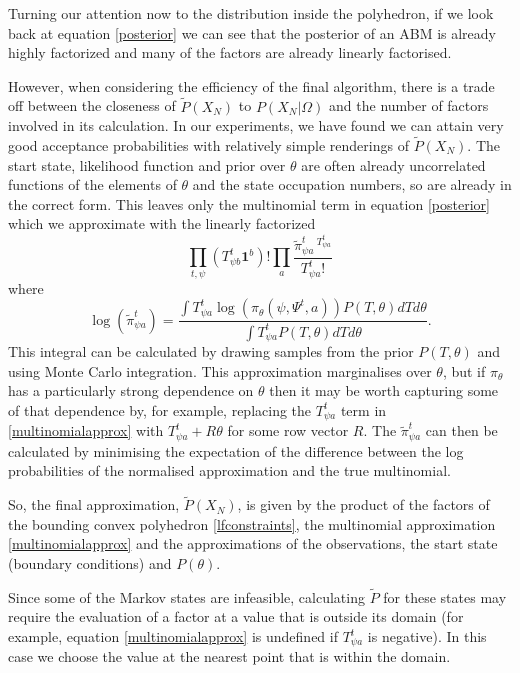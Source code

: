 \documentclass{article}
\begin{document}
Turning our attention now to the distribution inside the polyhedron, if we look back at equation \eqref{posterior} we can see that the posterior of an ABM is already highly factorized and many of the factors are already linearly factorised.

However, when considering the efficiency of the final algorithm, there is a trade off between the closeness of $\tilde{P}(X_N)$ to $P(X_N|\Omega)$ and the number of factors involved in its calculation. In our experiments, we have found we can attain very good acceptance probabilities with relatively simple renderings of $\tilde{P}(X_N)$. The start state, likelihood function and prior over $\theta$ are often already uncorrelated functions of the elements of $\theta$ and the state occupation numbers, so are already in the correct form. This leaves only the multinomial term in equation \eqref{posterior} which we approximate with the linearly factorized
\begin{equation}
\prod_{t, \psi}\left(T^t_{\psi b}\mathbf{1}^b\right)! \prod_a \frac{\tilde{\pi}^t_{\psi a}\,^{T^t_{\psi a}}}{T^t_{\psi a}!}
\label{multinomialapprox}
\end{equation}
where
\[
\log(\tilde{\pi}^t_{\psi a}) = \frac{\int T^t_{\psi a}\log\left(\pi_\theta(\psi, \Psi^t, a)\right)P(T,\theta) dT d\theta}{\int T^t_{\psi a}P(T,\theta) dT d\theta}.
\]
This integral can be calculated by drawing samples from the prior $P(T,\theta)$ and using Monte Carlo integration. This approximation marginalises over $\theta$, but if $\pi_\theta$ has a particularly strong dependence on $\theta$ then it may be worth capturing some of that dependence by, for example, replacing the $T^t_{\psi a}$ term in \eqref{multinomialapprox} with $T^t_{\psi a} + R\theta$ for some row vector $R$. The $\tilde{\pi}^t_{\psi a}$ can then be calculated by minimising the expectation of the difference between the log probabilities of the normalised approximation and the true multinomial.

So, the final approximation, $\tilde{P}(X_N)$, is given by the product of the factors of the bounding convex polyhedron \eqref{lfconstraints}, the multinomial approximation \eqref{multinomialapprox} and the approximations of the observations, the start state (boundary conditions) and $P(\theta)$.

Since some of the Markov states are infeasible, calculating $\tilde{P}$ for these states may require the evaluation of a factor at a value that is outside its domain (for example, equation \eqref{multinomialapprox} is undefined if $T^t_{\psi a}$ is negative). In this case we choose the value at the nearest point that is within the domain.
\end{document}
